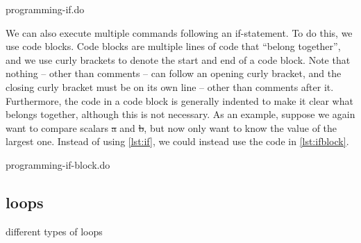 \begin{listing}[tbp]
\caption{programming-if.do}\label{lst:if}
\end{listing}

We can also execute multiple commands following an if-statement.
To do this, we use code blocks.
Code blocks are multiple lines of code that ``belong together'',
and we use curly brackets to denote the start and end of a code block.
Note that nothing -- other than comments -- can follow an opening curly bracket,
and the closing curly bracket must be on its own line --
other than comments after it.
Furthermore,
the code in a code block is generally indented to make it clear what belongs together,
although this is not necessary.
As an example,
suppose we again want to compare scalars \st{a} and \st{b},
but now only want to know the value of the largest one.
Instead of using \cref{lst:if},
we could instead use the code in \cref{lst:ifblock}.

\begin{listing}[tbp]
\caption{programming-if-block.do}\label{lst:ifblock}
\end{listing}

\subsection{loops}

different types of loops
